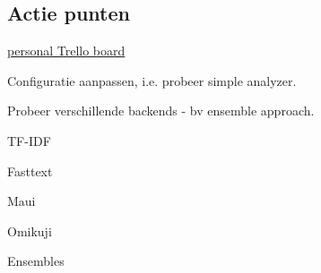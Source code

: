 \documentclass{article}
\newcommand{\cmark}{\ding{51}}%
\newcommand{\done}{\rlap{$\square$}{\raisebox{2pt}{\large\hspace{1pt}\cmark}}%
\hspace{-2.5pt}}
\begin{document}
\subsection{Actie punten}
\href{https://trello.com/b/Hy6Ol32K}{personal Trello board}

  \begin{todolist}
    \item[\done] Configuratie aanpassen, i.e. probeer simple analyzer.
    \item Probeer verschillende backends - bv ensemble approach.
    
    \begin{todolist}
      \item[\done] TF-IDF
      \item[\done] Fasttext
      \item Maui 
      \item Omikuji
      \item Ensembles
    \end{todolist}


\end{todolist}
\end{document}
